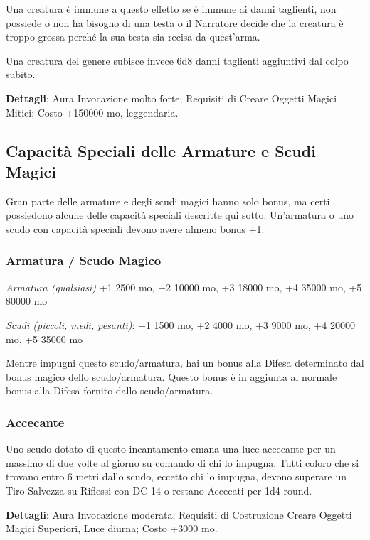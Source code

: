 \begin{multicols}{2}
	Una creatura è immune a questo effetto se è immune ai danni taglienti, non possiede o non ha bisogno di una testa o il Narratore decide che la creatura è troppo grossa perché la sua testa sia recisa da quest'arma.

	Una creatura del genere subisce invece 6d8 danni taglienti aggiuntivi dal colpo subito.

	\textbf{Dettagli}: Aura Invocazione molto forte; Requisiti di Creare Oggetti Magici Mitici; Costo +150000 mo, leggendaria.

	\subsection{Capacità Speciali delle Armature e Scudi Magici}

	Gran parte delle armature e degli scudi magici hanno solo bonus, ma certi possiedono alcune delle capacità speciali descritte qui sotto. Un'armatura o uno scudo con capacità speciali devono avere almeno bonus +1.

	\subsubsection*{Armatura / Scudo Magico}

	\textit{Armatura (qualsiasi)} +1 2500 mo, +2 10000 mo, +3 18000 mo, +4 35000 mo, +5 80000 mo

	\textit{Scudi (piccoli, medi, pesanti)}: +1 1500 mo, +2 4000 mo, +3 9000 mo, +4 20000 mo, +5 35000 mo

	Mentre impugni questo scudo/armatura, hai un bonus alla Difesa determinato dal bonus magico dello scudo/armatura. Questo bonus è in aggiunta al normale bonus alla Difesa fornito dallo scudo/armatura.

	\subsubsection*{Accecante}

	Uno scudo dotato di questo incantamento emana una luce accecante per un massimo di due volte al giorno su comando di chi lo impugna. Tutti coloro che si trovano entro 6 metri dallo scudo, eccetto chi lo impugna, devono superare un Tiro Salvezza su Riflessi con DC 14 o restano Accecati per 1d4 round.

	\textbf{Dettagli}: Aura Invocazione moderata; Requisiti di Costruzione Creare Oggetti Magici Superiori, Luce diurna; Costo +3000 mo.


\end{multicols}
